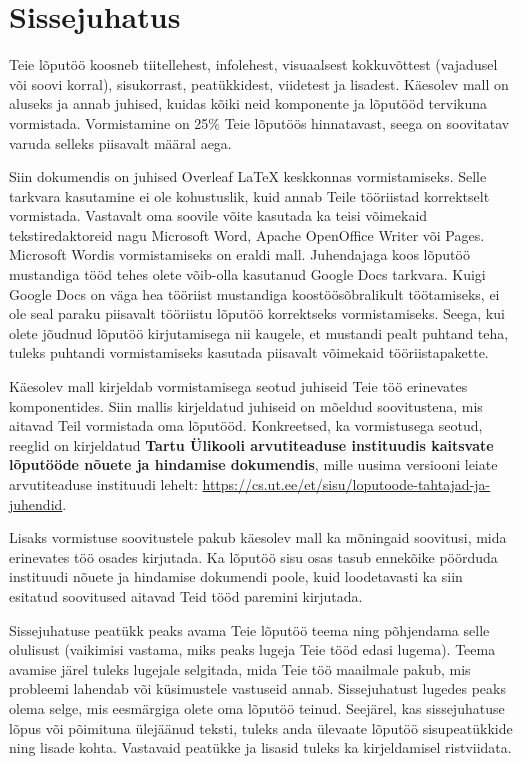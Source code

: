 \section{Sissejuhatus} \label{sissejuhatus}

Teie lõputöö koosneb tiitellehest, infolehest, visuaalsest kokkuvõttest (vajadusel või soovi korral), sisukorrast, peatükkidest, viidetest ja lisadest. Käesolev mall on aluseks ja annab juhised, kuidas kõiki neid komponente ja lõputööd tervikuna vormistada. Vormistamine on 25\% Teie lõputöös hinnatavast, seega on soovitatav varuda selleks piisavalt määral aega.

Siin dokumendis on juhised Overleaf LaTeX keskkonnas vormistamiseks. Selle tarkvara kasutamine ei ole kohustuslik, kuid annab Teile tööriistad korrektselt vormistada. Vastavalt oma soovile võite kasutada ka teisi võimekaid tekstiredaktoreid nagu Microsoft Word, Apache OpenOffice Writer või Pages. Microsoft Wordis vormistamiseks on eraldi mall. Juhendajaga koos lõputöö mustandiga tööd tehes olete võib-olla kasutanud Google Docs tarkvara. Kuigi Google Docs on väga hea tööriist mustandiga koostöösõbralikult töötamiseks, ei ole seal paraku piisavalt tööriistu lõputöö korrektseks vormistamiseks. Seega, kui olete jõudnud lõputöö kirjutamisega nii kaugele, et mustandi pealt puhtand teha, tuleks puhtandi vormistamiseks kasutada piisavalt võimekaid tööriistapakette.

Käesolev mall kirjeldab vormistamisega seotud juhiseid Teie töö erinevates komponentides. Siin mallis kirjeldatud juhiseid on mõeldud soovitustena, mis aitavad Teil vormistada oma lõputööd. Konkreetsed, ka vormistusega seotud, reeglid on kirjeldatud \textbf{Tartu Ülikooli arvutiteaduse instituudis kaitsvate lõputööde nõuete ja hindamise dokumendis}, mille uusima versiooni leiate arvutiteaduse instituudi lehelt: \url{https://cs.ut.ee/et/sisu/loputoode-tahtajad-ja-juhendid}.

Lisaks vormistuse soovitustele pakub käesolev mall ka mõningaid soovitusi, mida erinevates töö osades kirjutada. Ka lõputöö sisu osas tasub ennekõike pöörduda instituudi nõuete ja hindamise dokumendi poole, kuid loodetavasti ka siin esitatud soovitused aitavad Teid tööd paremini kirjutada.

Sissejuhatuse peatükk peaks avama Teie lõputöö teema ning põhjendama selle olulisust (vaikimisi vastama, miks peaks lugeja Teie tööd edasi lugema). Teema avamise järel tuleks lugejale selgitada, mida Teie töö maailmale pakub, mis probleemi lahendab või küsimustele vastuseid annab. Sissejuhatust lugedes peaks olema selge, mis eesmärgiga olete oma lõputöö teinud. Seejärel, kas sissejuhatuse lõpus või põimituna ülejäänud teksti, tuleks anda ülevaate lõputöö sisupeatükkide ning lisade kohta. Vastavaid peatükke ja lisasid tuleks ka kirjeldamisel ristviidata.

